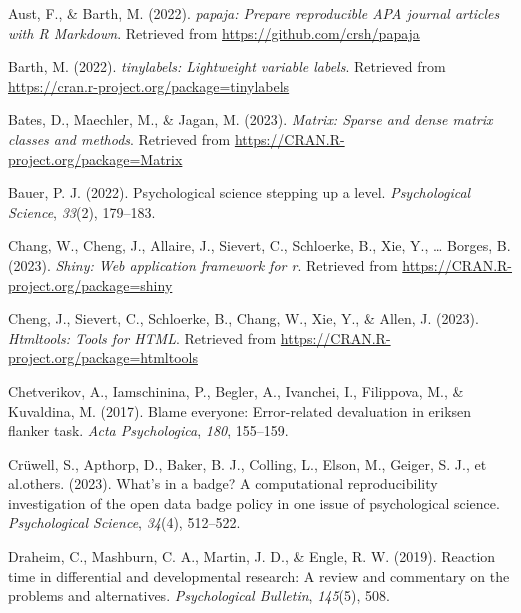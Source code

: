 \documentclass[
  man,floatsintext]{apa6}
\newlength{\cslhangindent}
\newlength{\cslentryspacingunit} %
\newenvironment{CSLReferences}[2] %
 {%
  \setlength{\parindent}{0pt}
  \ifodd #1
  \let\oldpar\par
  \def\par{\hangindent=\cslhangindent\oldpar}
  \fi
  \setlength{\parskip}{#2\cslentryspacingunit}
 }%
 {}
\begin{document}
\hypertarget{refs}{}
\begin{CSLReferences}{1}{0}
\leavevmode{}%
Aust, F., \& Barth, M. (2022). \emph{{papaja}: {Prepare} reproducible {APA} journal articles with {R Markdown}}. Retrieved from \url{https://github.com/crsh/papaja}

\leavevmode{}%
Barth, M. (2022). \emph{{tinylabels}: Lightweight variable labels}. Retrieved from \url{https://cran.r-project.org/package=tinylabels}

\leavevmode{}%
Bates, D., Maechler, M., \& Jagan, M. (2023). \emph{Matrix: Sparse and dense matrix classes and methods}. Retrieved from \url{https://CRAN.R-project.org/package=Matrix}

\leavevmode{}%
Bauer, P. J. (2022). Psychological science stepping up a level. \emph{Psychological Science}, \emph{33}(2), 179--183.

\leavevmode{}%
Chang, W., Cheng, J., Allaire, J., Sievert, C., Schloerke, B., Xie, Y., \ldots{} Borges, B. (2023). \emph{Shiny: Web application framework for r}. Retrieved from \url{https://CRAN.R-project.org/package=shiny}

\leavevmode{}%
Cheng, J., Sievert, C., Schloerke, B., Chang, W., Xie, Y., \& Allen, J. (2023). \emph{Htmltools: Tools for HTML}. Retrieved from \url{https://CRAN.R-project.org/package=htmltools}

\leavevmode{}%
Chetverikov, A., Iamschinina, P., Begler, A., Ivanchei, I., Filippova, M., \& Kuvaldina, M. (2017). Blame everyone: Error-related devaluation in eriksen flanker task. \emph{Acta Psychologica}, \emph{180}, 155--159.

\leavevmode{}%
Crüwell, S., Apthorp, D., Baker, B. J., Colling, L., Elson, M., Geiger, S. J., et al.others. (2023). What's in a badge? A computational reproducibility investigation of the open data badge policy in one issue of psychological science. \emph{Psychological Science}, \emph{34}(4), 512--522.

\leavevmode{}%
Draheim, C., Mashburn, C. A., Martin, J. D., \& Engle, R. W. (2019). Reaction time in differential and developmental research: A review and commentary on the problems and alternatives. \emph{Psychological Bulletin}, \emph{145}(5), 508.


\end{CSLReferences}
\end{document}
